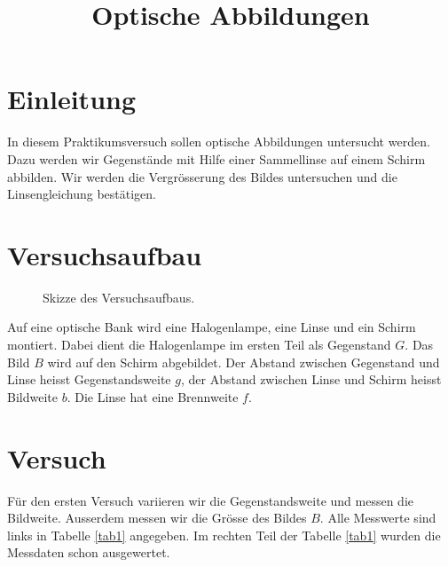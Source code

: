 \documentclass[11pt,a4paper]{article}
\author{}
\title{Optische Abbildungen}
\begin{document}
\maketitle


\section{Einleitung}
In diesem Praktikumsversuch sollen optische Abbildungen untersucht werden.
Dazu werden wir Gegenstände mit Hilfe einer Sammellinse auf einem Schirm abbilden.
Wir werden die Vergrösserung des Bildes untersuchen und die Linsengleichung
bestätigen.

\section{Versuchsaufbau}

\begin{figure}[h]
	\begin{center}
	
	\caption{\label{fig1} Skizze des Versuchsaufbaus.} 
	\end{center}
\end{figure}

Auf eine optische Bank wird eine Halogenlampe, eine Linse und ein Schirm montiert.
Dabei dient die Halogenlampe im ersten Teil als Gegenstand $G$.
Das Bild $B$ wird auf den Schirm abgebildet.
Der Abstand zwischen Gegenstand und Linse heisst Gegenstandsweite $g$, der Abstand zwischen
Linse und Schirm heisst Bildweite $b$.
Die Linse hat eine Brennweite $f$.

\section{Versuch}

Für den ersten Versuch variieren wir die Gegenstandsweite und messen die Bildweite.
Ausserdem messen wir die Grösse des Bildes $B$. Alle Messwerte sind links in Tabelle \ref{tab1} angegeben.
Im rechten Teil der Tabelle \ref{tab1} wurden die Messdaten schon ausgewertet. 
\end{document}
